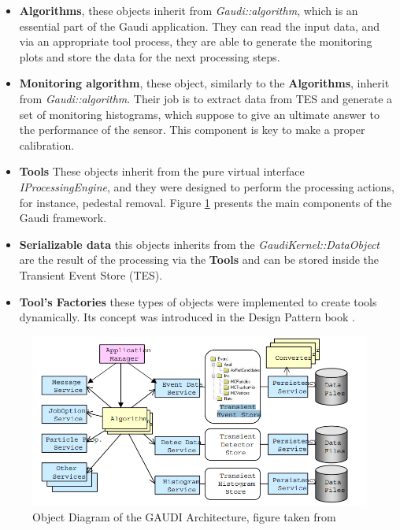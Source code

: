 \begin{itemize}
    \item \textbf{Algorithms}, these objects inherit from \textit{Gaudi::algorithm}, which is an essential part of the Gaudi application. They can read the input data, and via an appropriate tool process, they are able to generate the monitoring plots and store the data for the next processing steps. 
    \item \textbf{Monitoring algorithm}, these object, similarly to the \textbf{Algorithms}, inherit from  \textit{Gaudi::algorithm}. Their job is to extract data from TES and generate a set of monitoring histograms, which suppose to give an ultimate answer to the performance of the sensor. This component is key to make a  proper calibration. 
    \item \textbf{Tools} These objects inherit from the pure virtual interface \textit{IProcessingEngine}, and they were designed to perform the processing actions, for instance, pedestal removal. Figure \ref{fig:gaudi flow} presents the main components of the Gaudi framework.   
    \item \textbf{Serializable data} this objects inherits from the \textit{GaudiKernel::DataObject} are the result of the processing via the \textbf{Tools} and can be stored inside the Transient Event Store (TES). 
    \item \textbf{ Tool's Factories} these types of objects were implemented to create tools dynamically. Its concept was introduced in the Design Pattern book \cite{DesignPatterns}. 
\end{itemize}

\begin{figure}[h]
\centering
\includegraphics{figures/Gaudi.png}
\caption{Object Diagram of the GAUDI Architecture, figure taken from \cite{Gaudi}}
\label{fig:gaudi flow}
\end{figure}


